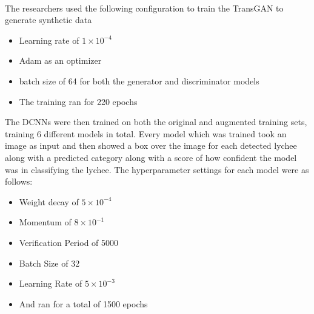\\
The researchers used the following configuration to train the TransGAN to generate synthetic data
\begin{itemize}
    \item Learning rate of $1 \times 10 ^ {-4}$
    \item Adam as an optimizer
    \item batch size of 64 for both the generator and discriminator models
    \item The training ran for 220 epochs
\end{itemize}

The DCNNs were then trained on both the original and augmented training sets, training 6 different models in total.  Every model which was trained took an image as input and then showed a box over the image for each detected lychee along with a predicted category along with a score of how confident the model was in classifying the lychee.  The hyperparameter settings for each model were as follows:
\begin{itemize}
    \item Weight decay of $5 \times 10 ^{-4}$
    \item Momentum of $8 \times 10^{-1}$
    \item Verification Period of 5000
    \item Batch Size of 32
    \item Learning Rate of $5 \times 10^{-3}$
    \item And ran for a total of 1500 epochs
\end{itemize}

